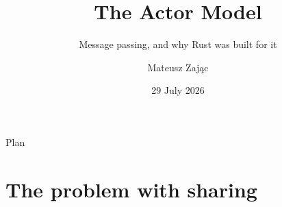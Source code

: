 

\usepackage[utf8]{inputenc}
\usepackage[T1]{fontenc}


\title{The Actor Model}
\subtitle{Message passing, and why Rust was built for it}
\author{Mateusz Zając}
\date{29 July 2026}



\maketitleframe

\begin{frame}{Plan}
  \tableofcontents
\end{frame}

\section{The problem with sharing}

